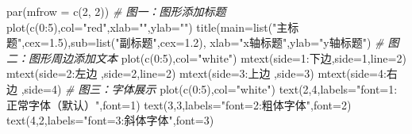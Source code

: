 \documentclass[
]{book}
\newenvironment{Shaded}{\begin{snugshade}}{\end{snugshade}}
\newcommand{\AttributeTok}[1]{\textcolor[rgb]{0.77,0.63,0.00}{#1}}
\newcommand{\CommentTok}[1]{\textcolor[rgb]{0.56,0.35,0.01}{\textit{#1}}}
\newcommand{\DecValTok}[1]{\textcolor[rgb]{0.00,0.00,0.81}{#1}}
\newcommand{\FloatTok}[1]{\textcolor[rgb]{0.00,0.00,0.81}{#1}}
\newcommand{\FunctionTok}[1]{\textcolor[rgb]{0.00,0.00,0.00}{#1}}
\newcommand{\NormalTok}[1]{#1}
\newcommand{\SpecialCharTok}[1]{\textcolor[rgb]{0.00,0.00,0.00}{#1}}
\newcommand{\StringTok}[1]{\textcolor[rgb]{0.31,0.60,0.02}{#1}}
\begin{document}
\begin{Shaded}
\begin{Highlighting}[]
\FunctionTok{par}\NormalTok{(}\AttributeTok{mfrow =} \FunctionTok{c}\NormalTok{(}\DecValTok{2}\NormalTok{, }\DecValTok{2}\NormalTok{))}
\CommentTok{\# 图一：图形添加标题}
\FunctionTok{plot}\NormalTok{(}\FunctionTok{c}\NormalTok{(}\DecValTok{0}\SpecialCharTok{:}\DecValTok{5}\NormalTok{),}\AttributeTok{col=}\StringTok{"red"}\NormalTok{,}\AttributeTok{xlab=}\StringTok{""}\NormalTok{,}\AttributeTok{ylab=}\StringTok{""}\NormalTok{)}
\FunctionTok{title}\NormalTok{(}\AttributeTok{main=}\FunctionTok{list}\NormalTok{(}\StringTok{"主标题"}\NormalTok{,}\AttributeTok{cex=}\FloatTok{1.5}\NormalTok{),}\AttributeTok{sub=}\FunctionTok{list}\NormalTok{(}\StringTok{"副标题"}\NormalTok{,}\AttributeTok{cex=}\FloatTok{1.2}\NormalTok{), }
      \AttributeTok{xlab=}\StringTok{"x轴标题"}\NormalTok{,}\AttributeTok{ylab=}\StringTok{"y轴标题"}\NormalTok{)}
\CommentTok{\# 图二：图形周边添加文本}
\FunctionTok{plot}\NormalTok{(}\FunctionTok{c}\NormalTok{(}\DecValTok{0}\SpecialCharTok{:}\DecValTok{5}\NormalTok{),}\AttributeTok{col=}\StringTok{"white"}\NormalTok{)}
\FunctionTok{mtext}\NormalTok{(}\StringTok{\textquotesingle{}side=1:下边\textquotesingle{}}\NormalTok{,}\AttributeTok{side=}\DecValTok{1}\NormalTok{,}\AttributeTok{line=}\DecValTok{2}\NormalTok{)}
\FunctionTok{mtext}\NormalTok{(}\StringTok{\textquotesingle{}side=2:左边\textquotesingle{}}\NormalTok{ ,}\AttributeTok{side=}\DecValTok{2}\NormalTok{,}\AttributeTok{line=}\DecValTok{2}\NormalTok{)}
\FunctionTok{mtext}\NormalTok{(}\StringTok{\textquotesingle{}side=3:上边\textquotesingle{}}\NormalTok{ ,}\AttributeTok{side=}\DecValTok{3}\NormalTok{)}
\FunctionTok{mtext}\NormalTok{(}\StringTok{\textquotesingle{}side=4:右边\textquotesingle{}}\NormalTok{ ,}\AttributeTok{side=}\DecValTok{4}\NormalTok{)}
\CommentTok{\# 图三：字体展示}
\FunctionTok{plot}\NormalTok{(}\FunctionTok{c}\NormalTok{(}\DecValTok{0}\SpecialCharTok{:}\DecValTok{5}\NormalTok{),}\AttributeTok{col=}\StringTok{"white"}\NormalTok{)}
\FunctionTok{text}\NormalTok{(}\DecValTok{2}\NormalTok{,}\DecValTok{4}\NormalTok{,}\AttributeTok{labels=}\StringTok{"font=1:正常字体（默认）"}\NormalTok{,}\AttributeTok{font=}\DecValTok{1}\NormalTok{)}
\FunctionTok{text}\NormalTok{(}\DecValTok{3}\NormalTok{,}\DecValTok{3}\NormalTok{,}\AttributeTok{labels=}\StringTok{"font=2:粗体字体"}\NormalTok{,}\AttributeTok{font=}\DecValTok{2}\NormalTok{)}
\FunctionTok{text}\NormalTok{(}\DecValTok{4}\NormalTok{,}\DecValTok{2}\NormalTok{,}\AttributeTok{labels=}\StringTok{"font=3:斜体字体"}\NormalTok{,}\AttributeTok{font=}\DecValTok{3}\NormalTok{)}

\end{Highlighting}
\end{Shaded}
\end{document}
